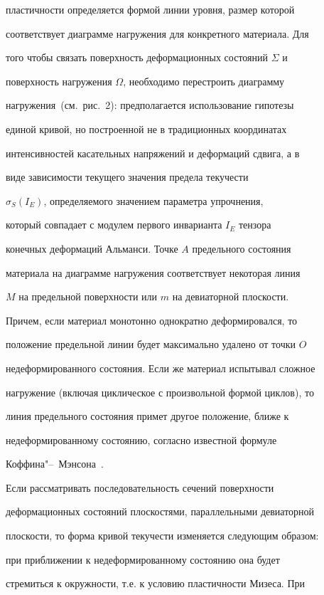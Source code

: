 пластичности определяется формой линии уровня, размер которой

соответствует диаграмме нагружения для конкретного материала. Для

того чтобы связать поверхность деформационных состояний $\Sigma$ и

поверхность нагружения $\Omega$, необходимо перестроить диаграмму

нагружения~(см.~рис.~2): предполагается использование гипотезы

единой кривой, но построенной не в традиционных координатах

интенсивностей касательных напряжений и деформаций сдвига, а в

виде зависимости текущего значения предела текучести

$\sigma_S(I_E)$, определяемого значением параметра упрочнения,

который совпадает с модулем первого инварианта $I_E$ тензора

конечных деформаций Альманси. Точке $A$ предельного состояния

материала на диаграмме нагружения соответствует некоторая линия

$M$ на предельной поверхности или $m$ на девиаторной плоскости.

Причем, если материал монотонно однократно деформировался, то

положение предельной линии будет максимально удалено от точки $O$

недеформированного состояния. Если же материал испытывал сложное

нагружение (включая циклическое с произвольной формой циклов), то

линия предельного состояния примет другое положение, ближе к

недеформированному состоянию, согласно известной формуле

Коффина"--~Мэнсона~\cite{bukh:bib:KotchBukhKhrom}.







Если рассматривать последовательность сечений поверхности

деформационных состояний плоскостями, параллельными девиаторной

плоскости, то форма кривой текучести изменяется следующим образом:

при приближении к недеформированному состоянию она будет

стремиться к окружности, т.е. к условию пластичности Мизеса. При

